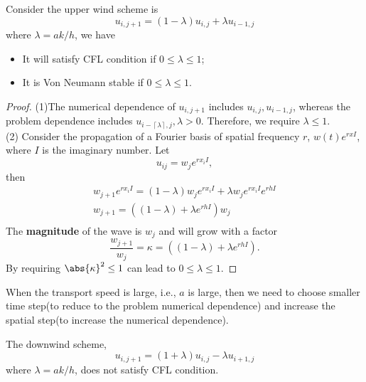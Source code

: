 \begin{refsection}
\begin{lemma}
	\cite[138]{holmes2007introduction}
	Consider the upper wind scheme is 
	$$u_{i,j+1} = (1 - \lambda)u_{i,j} + \lambda u_{i-1,j}$$
	where $\lambda = ak/h$, 
	we have
	\begin{itemize}
		\item It will satisfy CFL condition if $0 \leq \lambda \leq 1$;
		\item It is Von Neumann stable if $0 \leq \lambda \leq 1$.
	\end{itemize}
\end{lemma}
\begin{proof}
(1)The numerical dependence of $u_{i,j+1}$ includes $u_{i,j}, u_{i-1,j}$, whereas the problem dependence includes $u_{i-\left \lceil{\lambda}\right \rceil,j},\lambda > 0$. Therefore, we require $\lambda \leq 1$.\\
(2) Consider the propagation of a Fourier basis of spatial frequency $r$, $w(t)e^{rxI}$, where $I$ is the imaginary number. Let $$u_{ij} = w_j e^{rx_i I},$$ then
\begin{align*}
w_{j+1}e^{rx_i I} = (1-\lambda)w_j e^{rx_i I} + \lambda w_j e^{rx_i I}e^{rhI} \\
w_{j+1} = ((1-\lambda) + \lambda e^{rhI} )w_j  \\
\end{align*}
The \textbf{magnitude} of the wave is $w_j$ and will grow with a factor
 $$\frac{w_{j+1}}{w_j} = \kappa = ((1-\lambda) + \lambda e^{rhI}).$$ By requiring $\abs{\kappa}^2 \leq 1$ can lead to $0 \leq \lambda \leq 1$.	
\end{proof}


\begin{remark}[intuition]
When the transport speed is large, i.e., $a$ is large, then we need to choose smaller time step(to reduce to the problem numerical dependence) and increase the spatial step(to increase the numerical dependence).
\end{remark}

\begin{lemma}
	The downwind scheme, 
	$$u_{i,j+1} = (1 + \lambda)u_{i,j} - \lambda u_{i+1,j}$$
	where $\lambda = ak/h$,
	does not satisfy CFL condition.	
	

\end{lemma}
\end{refsection}
